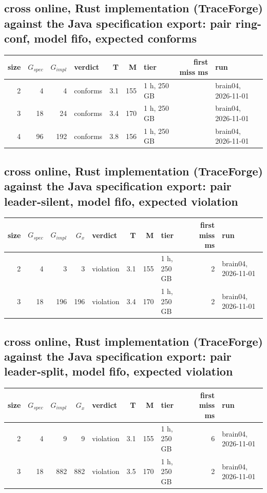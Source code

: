 \documentclass[10pt]{article}
\begin{document}
\subsection*{cross online, Rust implementation (TraceForge) against the Java specification export: pair \textsf{ring-conf}, model fifo, expected conforms}
\begin{longtable}{@{}rrrlrrlrl@{}}
\toprule
size & $G_{\mathit{spec}}$ & $G_{\mathit{impl}}$ & verdict & T & M & tier & first miss ms & run \\
\midrule
\endhead
\color{red} 2 & 4 & 4 & conforms & 3.1 & 155 & 1 h, 250 GB &  & brain04, 2026-11-01 \\
\color{red} 3 & 18 & 24 & conforms & 3.4 & 170 & 1 h, 250 GB &  & brain04, 2026-11-01 \\
\color{red} 4 & 96 & 192 & conforms & 3.8 & 156 & 1 h, 250 GB &  & brain04, 2026-11-01 \\
\bottomrule
\end{longtable}
\subsection*{cross online, Rust implementation (TraceForge) against the Java specification export: pair \textsf{leader-silent}, model fifo, expected violation}
\begin{longtable}{@{}rrrrlrrlrl@{}}
\toprule
size & $G_{\mathit{spec}}$ & $G_{\mathit{impl}}$ & $G_x$ & verdict & T & M & tier & first miss ms & run \\
\midrule
\endhead
\color{red} 2 & 4 & 3 & 3 & violation & 3.1 & 155 & 1 h, 250 GB & 2 & brain04, 2026-11-01 \\
\color{red} 3 & 18 & 196 & 196 & violation & 3.4 & 170 & 1 h, 250 GB & 2 & brain04, 2026-11-01 \\
\bottomrule
\end{longtable}
\subsection*{cross online, Rust implementation (TraceForge) against the Java specification export: pair \textsf{leader-split}, model fifo, expected violation}
\begin{longtable}{@{}rrrrlrrlrl@{}}
\toprule
size & $G_{\mathit{spec}}$ & $G_{\mathit{impl}}$ & $G_x$ & verdict & T & M & tier & first miss ms & run \\
\midrule
\endhead
\color{red} 2 & 4 & 9 & 9 & violation & 3.1 & 155 & 1 h, 250 GB & 6 & brain04, 2026-11-01 \\
\color{red} 3 & 18 & 882 & 882 & violation & 3.5 & 170 & 1 h, 250 GB & 2 & brain04, 2026-11-01 \\
\bottomrule
\end{longtable}
\end{document}
